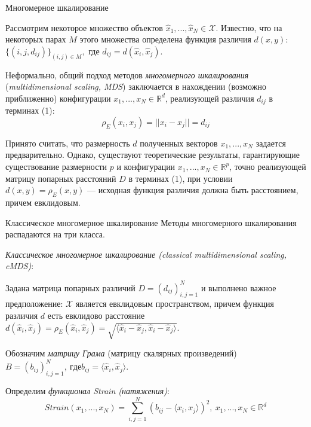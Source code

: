 \documentclass[9pt]{beamer}
\begin{document}
\begin{frame}{Многомерное шкалирование}

Рассмотрим некоторое множество объектов $\hat{x}_1, ..., \hat{x}_N \in \mathcal{X}$. Известно, что на некоторых парах $M$ этого множества определена функция различия $d(x, y)$: $\{(i, j, d_{ij})\}_{(i, j) \in M},$ где $d_{ij} = d(\hat{x}_i, \hat{x}_j)$.

\vspace{\baselineskip}
Неформально, общий подход методов \textit{многомерного шкалирования} (\textit{multidimensional scaling, MDS}) заключается в нахождении (возможно приближенно) конфигурации $x_1,...,x_N \in \mathbb{R}^d$, реализующей различия $d_{ij}$ в терминах (1):
$$\rho_E(x_i, x_j) = ||x_i - x_j|| = d_{ij} $$

\vspace{\baselineskip}
Принято считать, что размерность $d$ полученных векторов $x_1, ..., x_N$ задается предварительно. Однако, существуют теоретические результаты, гарантирующие существование размерности $p$ и конфигурации $x_1, ..., x_N \in \mathbb{R}^p$, точно реализующей матрицу попарных расстояний $D$ в терминах (1), при условии $d(x,y) = \rho_E(x, y)$ --- исходная функция различия должна быть расстоянием, причем евклидовым.
    
\end{frame}

\begin{frame}{Классическое многомерное шкалирование}
Методы многомерного шкалирования распадаются на три класса.
\vspace{\baselineskip}

\textit{Классическое многомерное шкалирование (classical multidimensional scaling, cMDS)}:
    \vspace{\baselineskip}
    
    Задана матрица попарных различий $D = (d_{ij})_{i,j=1}^N$ и выполнено важное предположение:
    $\mathcal{X}$ является евклидовым пространством, причем функция различия $d$ есть евклидово расстояние $d(\hat{x}_i, \hat{x}_j) = \rho_E(\hat{x}_i, \hat{x}_j) = \sqrt{\langle \hat{x}_i - \hat{x}_j, \hat{x}_i - \hat{x}_j \rangle}$.
    
    \vspace{\baselineskip}
    Обозначим \textit{матрицу Грама} (матрицу скалярных произведений) $
        B = (b_{ij})_{i,j=1}^N, \: где b_{ij} = \langle \hat{x}_i, \hat{x}_j \rangle.
    $

    Определим \textit{функционал Strain (натяжения)}:
    \begin{equation}
    \label{strain1}
        Strain(x_1, ..., x_N) = \sum_{i, j=1}^{N} (b_{ij} - \langle x_i, x_j \rangle)^2, \: x_1, ..., x_N \in \mathbb{R}^d
    \end{equation}
    
\end{frame}
\end{document}
